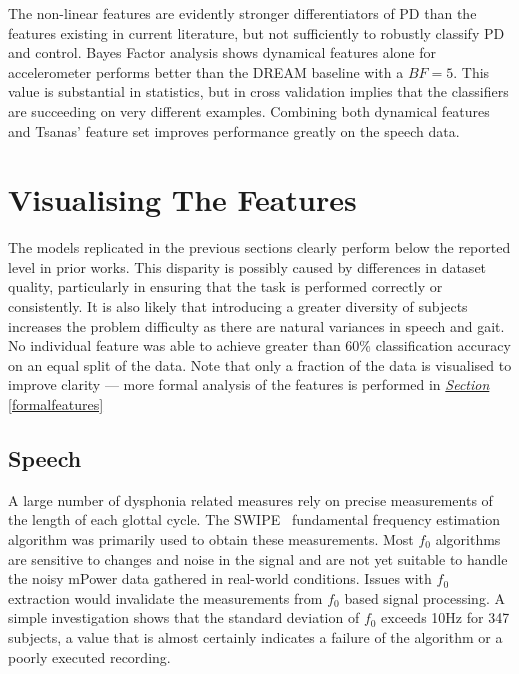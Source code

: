 \documentclass[12pt, twoside]{book}
\begin{document}
The non-linear features are evidently stronger differentiators of PD than the features existing in current literature, but not sufficiently to robustly classify PD and control. Bayes Factor analysis shows dynamical features alone for accelerometer performs better than the DREAM baseline with a $BF=5$. This value is substantial in statistics, but in cross validation implies that the classifiers are succeeding on very different examples. Combining both dynamical features and Tsanas' feature set improves performance greatly on the speech data.

\section{Visualising The Features}
\label{visfeature}
The models replicated in the previous sections clearly perform below the reported level in prior works. This disparity is possibly caused by differences in dataset quality, particularly in ensuring that the task is performed correctly or consistently. It is also likely that introducing a greater diversity of subjects increases the problem difficulty as there are natural variances in speech and gait. No individual feature was able to achieve greater than 60\% classification accuracy on an equal split of the data. Note that only a fraction of the data is visualised to improve clarity --- more formal analysis of the features is performed in \textit{\hyperref[formalfeatures]{Section}} \ref{formalfeatures}

\subsection{Speech}
A large number of dysphonia related measures rely on precise measurements of the length of each glottal cycle. The SWIPE~\cite{camacho2007swipe} fundamental frequency estimation algorithm was primarily used to obtain these measurements. Most $f_0$ algorithms are sensitive to changes and noise in the signal and are not yet suitable to handle the noisy mPower data gathered in real-world conditions. Issues with $f_0$ extraction would invalidate the measurements from $f_0$ based signal processing. A simple investigation shows that the standard deviation of $f_0$ exceeds 10Hz for 347 subjects, a value that is almost certainly indicates a failure of the algorithm or a poorly executed recording.
\end{document}
